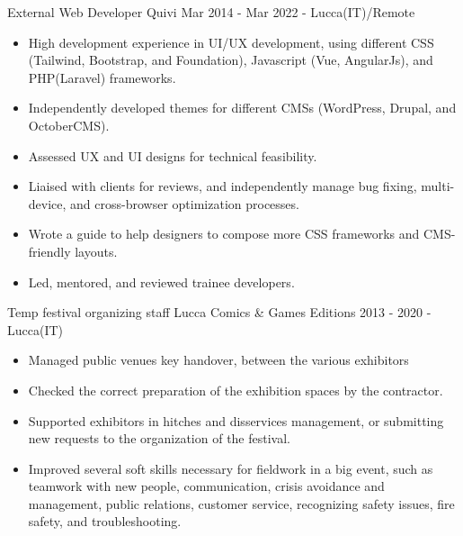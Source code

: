 \documentclass[11pt]{strongalecv}
\begin{document}
\begin{MainPart}
    \Experience
        {\ColorTextMain}
		{External Web Developer}
		{Quivi}
        {\faCalendarO\space Mar 2014 - Mar 2022 - \faMapMarker\space  Lucca(IT)/Remote}
        {   
            \begin{itemize}[leftmargin=0.5cm, itemsep=0.1cm]
                \item [{\color{purple}\tiny\faSquare}] \small High development experience in UI/UX development, using different CSS (Tailwind, Bootstrap, and Foundation), Javascript (Vue, AngularJs), and PHP(Laravel) frameworks.
                \item [{\color{purple}\tiny\faSquare}] \small Independently developed themes for different CMSs (WordPress, Drupal, and OctoberCMS).
                \item [{\color{purple}\tiny\faSquare}] \small Assessed UX and UI designs for technical feasibility.
                \item [{\color{purple}\tiny\faSquare}] \small Liaised with clients for reviews, and independently manage bug fixing, multi-device, and cross-browser optimization processes.
                \item [{\color{purple}\tiny\faSquare}] \small Wrote a guide to help designers to compose more CSS frameworks and CMS-friendly layouts.
                \item [{\color{purple}\tiny\faSquare}] \small Led, mentored, and reviewed trainee developers.
            \end{itemize}
        }
    \Experience
        {\ColorTextMain}
		{Temp festival organizing staff}
		{Lucca Comics \& Games}
        {\faCalendarO\space Editions 2013 - 2020 - \faMapMarker\space  Lucca(IT)}
        {   
            \begin{itemize}[leftmargin=0.5cm, itemsep=0.1cm]
                \item [{\color{purple}\tiny\faSquare}] \small Managed public venues key handover, between the various exhibitors
                \item [{\color{purple}\tiny\faSquare}] \small Checked the correct preparation of the exhibition spaces by the contractor.
                \item [{\color{purple}\tiny\faSquare}] \small Supported exhibitors in hitches and disservices management, or submitting new requests to the organization of the festival.
                \item [{\color{purple}\tiny\faSquare}] \small Improved several soft skills necessary for fieldwork in a big event, such as teamwork with new people, communication, crisis avoidance and management, public relations, customer service, recognizing safety issues, fire safety, and troubleshooting.
            \end{itemize}
        }
        


\end{MainPart}
\end{document}
